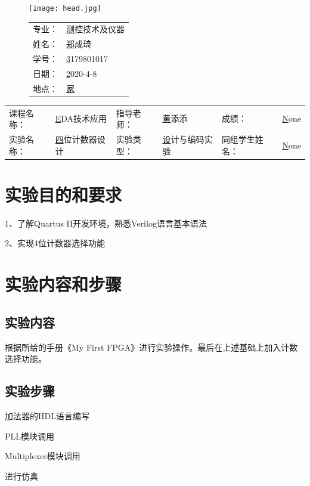 \documentclass{zjureport}
\newcommand{\major}{测控技术及仪器}
\newcommand{\name}{郑成琦}
\newcommand{\stuid}{3179801017}
\newcommand{\newdate}{2020-4-8}
\newcommand{\loc}{家}
\newcommand{\course}{EDA技术应用}
\newcommand{\tutor}{黄添添}
\newcommand{\grades}{None}
\newcommand{\newtitle}{四位计数器设计}
\newcommand{\exptype}{设计与编码实验}
\newcommand{\group}{None}
\begin{document}
\thispagestyle{empty}
\begin{figure}[h]
  \begin{minipage}{0.6\linewidth}
    \centerline{\texttt{[image: head.jpg]}}
  \end{minipage}
  \hfill
  \begin{minipage}{.4\linewidth}
    \raggedleft
    \begin{tabular*}{.8\linewidth}{ll}
      专业： & \underline\major   \\
      姓名： & \underline\name    \\
      学号： & \underline\stuid   \\
      日期： & \underline\newdate \\
      地点： & \underline\loc
    \end{tabular*}
  \end{minipage}
\end{figure}

\begin{table}[!htbp]
  \centering
  \begin{tabular*}{\linewidth}{llllll}
    课程名称： & \underline\course   & 指导老师： & \underline\tutor   & 成绩：       &  \underline\grades \\
    实验名称： & \underline\newtitle & 实验类型： & \underline\exptype & 同组学生姓名：& \underline\group
  \end{tabular*}
\end{table}


\section{实验目的和要求}
1、了解Quartus II开发环境，熟悉Verilog语言基本语法

2、实现4位计数器选择功能
\section{实验内容和步骤}

  \subsection{实验内容}
	根据所给的手册《My First FPGA》进行实验操作。最后在上述基础上加入计数选择功能。
  \subsection{实验步骤}
	\begin{clause}
		\item 加法器的HDL语言编写
		\item PLL模块调用
		\item Multiplexer模块调用
		\item 进行仿真
	\end{clause}
\end{document}

